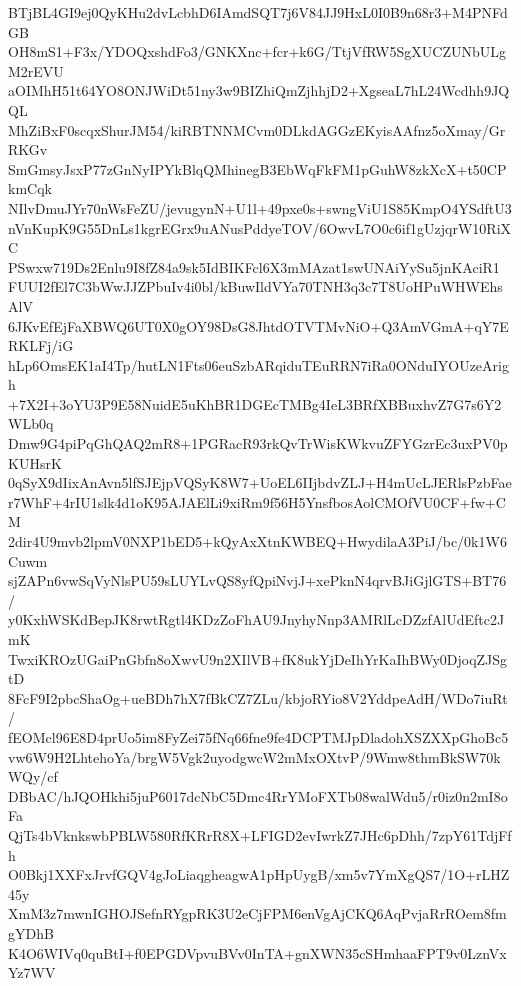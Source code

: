 BTjBL4GI9ej0QyKHu2dvLcbhD6IAmdSQT7j6V84JJ9HxL0I0B9n68r3+M4PNFdGB
OH8mS1+F3x/YDOQxshdFo3/GNKXnc+fcr+k6G/TtjVfRW5SgXUCZUNbULgM2rEVU
aOIMhH51t64YO8ONJWiDt51ny3w9BIZhiQmZjhhjD2+XgseaL7hL24Wcdhh9JQQL
MhZiBxF0scqxShurJM54/kiRBTNNMCvm0DLkdAGGzEKyisAAfnz5oXmay/GrRKGv
SmGmsyJsxP77zGnNyIPYkBlqQMhinegB3EbWqFkFM1pGuhW8zkXcX+t50CPkmCqk
NIlvDmuJYr70nWsFeZU/jevugynN+U1l+49pxe0s+swngViU1S85KmpO4YSdftU3
nVnKupK9G55DnLs1kgrEGrx9uANusPddyeTOV/6OwvL7O0c6if1gUzjqrW10RiXC
PSwxw719Ds2Enlu9I8fZ84a9sk5IdBIKFcl6X3mMAzat1swUNAiYySu5jnKAciR1
FUUI2fEl7C3bWwJJZPbuIv4i0bl/kBuwIldVYa70TNH3q3c7T8UoHPuWHWEhsAlV
6JKvEfEjFaXBWQ6UT0X0gOY98DsG8JhtdOTVTMvNiO+Q3AmVGmA+qY7ERKLFj/iG
hLp6OmsEK1aI4Tp/hutLN1Fts06euSzbARqiduTEuRRN7iRa0ONduIYOUzeArigh
+7X2I+3oYU3P9E58NuidE5uKhBR1DGEcTMBg4IeL3BRfXBBuxhvZ7G7s6Y2WLb0q
Dmw9G4piPqGhQAQ2mR8+1PGRacR93rkQvTrWisKWkvuZFYGzrEc3uxPV0pKUHsrK
0qSyX9dIixAnAvn5lfSJEjpVQSyK8W7+UoEL6IIjbdvZLJ+H4mUcLJERlsPzbFae
r7WhF+4rIU1slk4d1oK95AJAElLi9xiRm9f56H5YnsfbosAolCMOfVU0CF+fw+CM
2dir4U9mvb2lpmV0NXP1bED5+kQyAxXtnKWBEQ+HwydilaA3PiJ/bc/0k1W6Cuwm
sjZAPn6vwSqVyNlsPU59sLUYLvQS8yfQpiNvjJ+xePknN4qrvBJiGjlGTS+BT76/
y0KxhWSKdBepJK8rwtRgtl4KDzZoFhAU9JnyhyNnp3AMRlLcDZzfAlUdEftc2JmK
TwxiKROzUGaiPnGbfn8oXwvU9n2XIlVB+fK8ukYjDeIhYrKaIhBWy0DjoqZJSgtD
8FcF9I2pbcShaOg+ueBDh7hX7fBkCZ7ZLu/kbjoRYio8V2YddpeAdH/WDo7iuRt/
fEOMcl96E8D4prUo5im8FyZei75fNq66fne9fe4DCPTMJpDladohXSZXXpGhoBc5
vw6W9H2LhtehoYa/brgW5Vgk2uyodgwcW2mMxOXtvP/9Wmw8thmBkSW70kWQy/cf
DBbAC/hJQOHkhi5juP6017dcNbC5Dmc4RrYMoFXTb08walWdu5/r0iz0n2mI8oFa
QjTs4bVknkswbPBLW580RfKRrR8X+LFIGD2evIwrkZ7JHc6pDhh/7zpY61TdjFfh
O0Bkj1XXFxJrvfGQV4gJoLiaqgheagwA1pHpUygB/xm5v7YmXgQS7/1O+rLHZ45y
XmM3z7mwnIGHOJSefnRYgpRK3U2eCjFPM6enVgAjCKQ6AqPvjaRrROem8fmgYDhB
K4O6WIVq0quBtI+f0EPGDVpvuBVv0InTA+gnXWN35cSHmhaaFPT9v0LznVxYz7WV
